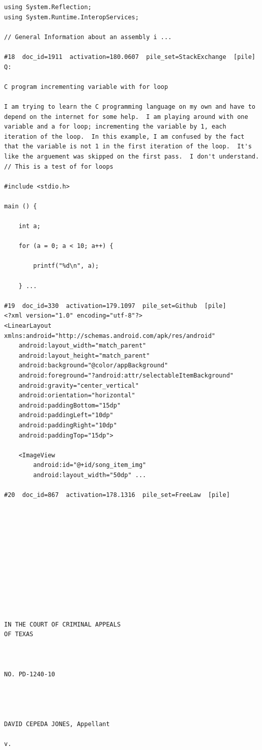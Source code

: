 \begin{verbatim}
using System.Reflection;
using System.Runtime.InteropServices;

// General Information about an assembly i ...

#18  doc_id=1911  activation=180.0607  pile_set=StackExchange  [pile]
Q:

C program incrementing variable with for loop

I am trying to learn the C programming language on my own and have to depend on the internet for some help.  I am playing around with one variable and a for loop; incrementing the variable by 1, each iteration of the loop.  In this example, I am confused by the fact that the variable is not 1 in the first iteration of the loop.  It's like the arguement was skipped on the first pass.  I don't understand.
// This is a test of for loops

#include <stdio.h>

main () {

    int a;

    for (a = 0; a < 10; a++) {

        printf("%d\n", a);

    } ...

#19  doc_id=330  activation=179.1097  pile_set=Github  [pile]
<?xml version="1.0" encoding="utf-8"?>
<LinearLayout xmlns:android="http://schemas.android.com/apk/res/android"
    android:layout_width="match_parent"
    android:layout_height="match_parent"
    android:background="@color/appBackground"
    android:foreground="?android:attr/selectableItemBackground"
    android:gravity="center_vertical"
    android:orientation="horizontal"
    android:paddingBottom="15dp"
    android:paddingLeft="10dp"
    android:paddingRight="10dp"
    android:paddingTop="15dp">

    <ImageView
        android:id="@+id/song_item_img"
        android:layout_width="50dp" ...

#20  doc_id=867  activation=178.1316  pile_set=FreeLaw  [pile]












IN THE COURT OF CRIMINAL APPEALS
OF TEXAS



NO. PD-1240-10




DAVID CEPEDA JONES, Appellant

v.


\end{verbatim}
